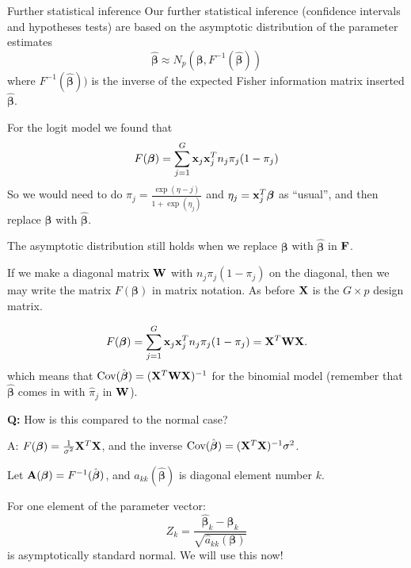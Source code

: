 \documentclass[
  ignorenonframetext,
]{beamer}
\begin{document}
\begin{frame}{Further statistical inference}
\protect\hypertarget{further-statistical-inference}{}
Our further statistical inference (confidence intervals and hypotheses
tests) are based on the asymptotic distribution of the parameter
estimates
\[\hat{\boldsymbol{\beta}} \approx N_p(\boldsymbol{\beta},F^{-1}(\hat{\boldsymbol{\beta}}))\]
where \(F^{-1}(\hat{\boldsymbol{\beta}}))\) is the inverse of the
expected Fisher information matrix inserted
\(\hat{\boldsymbol{\beta}}\).

For the logit model we found that
\[F(\boldsymbol{\beta})=\sum_{j=1}^G {\bf x}_j {\bf x}_j^T n_j \pi_j (1-\pi_j)\]
So we would need to do \(\pi_j=\frac{\exp(\eta-j)}{1+\exp(\eta_j)}\) and
\(\eta_j={\bf x}_j^T\boldsymbol{\beta}\) as ``usual'', and then replace
\(\boldsymbol{\beta}\) with \(\hat{\boldsymbol{\beta}}\).

The asymptotic distribution still holds when we replace
\(\boldsymbol{\beta}\) with \(\hat{\boldsymbol{\beta}}\) in \({\bf F}\).
\end{frame}

\begin{frame}
If we make a diagonal matrix \({\bf W}\) with \(n_j \pi_j (1-\pi_j)\) on
the diagonal, then we may write the matrix \(F(\boldsymbol{\beta})\) in
matrix notation. As before \({\bf X}\) is the \(G\times p\) design
matrix.

\[F(\boldsymbol{\beta})=\sum_{j=1}^G {\bf x}_j {\bf x}_j^T n_j \pi_j (1-\pi_j)={\bf X}^T {\bf W} {\bf X}.\]
which means that
\(\text{Cov}(\hat{\boldsymbol{\beta}})=({\bf X}^T {\bf W} {\bf X})^{-1}\)
for the binomial model (remember that \(\hat{\boldsymbol{\beta}}\) comes
in with \(\hat{\pi}_j\) in \({\bf W}\)).

\textbf{Q:} How is this compared to the normal case?

A: \(F(\boldsymbol{\beta})=\frac{1}{\sigma^2}{\bf X}^T{\bf X}\), and the
inverse
\(\text{Cov}(\hat{\boldsymbol{\beta}})=({\bf X}^T {\bf X})^{-1}\sigma^2\).
\end{frame}

\begin{frame}
Let \({\bf A}(\boldsymbol{\beta})=F^{-1}(\hat{\boldsymbol{\beta}})\),
and \(a_{kk}(\hat{\boldsymbol{\beta}})\) is diagonal element number
\(k\).

For one element of the parameter vector:
\[ Z_k=\frac{\hat{\boldsymbol{\beta}}_k-\boldsymbol{\beta}_k}{\sqrt{\hat{a}_{kk}({\boldsymbol{\beta}})}}\]
is asymptotically standard normal. We will use this now!
\end{frame}
\end{document}
